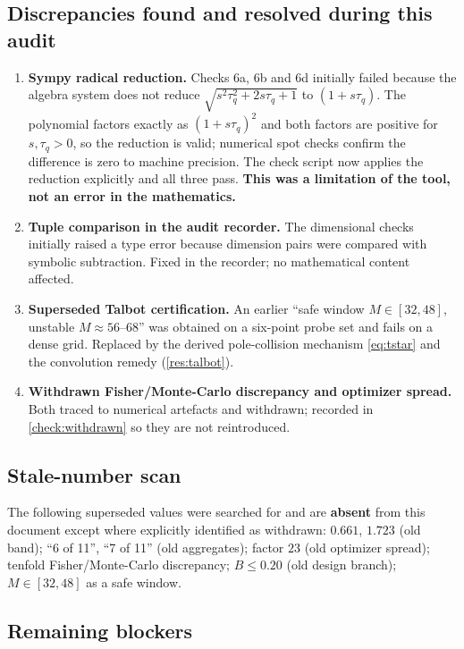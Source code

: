 \documentclass[11pt,a4paper]{article}
\theoremstyle{definition}
\newcommand{\tq}{\tau_{q}}
\newcommand{\Bnum}{B}
\begin{document}
\subsection{Discrepancies found and resolved during this audit}

\begin{enumerate}[label=(D\arabic*)]
\item \textbf{Sympy radical reduction.} Checks 6a, 6b and 6d initially failed
because the algebra system does not reduce
$\sqrt{s^{2}\tq^{2}+2s\tq+1}$ to $(1+s\tq)$. The polynomial factors exactly as
$(1+s\tq)^{2}$ and both factors are positive for $s,\tq>0$, so the reduction is
valid; numerical spot checks confirm the difference is zero to machine
precision. The check script now applies the reduction explicitly and all three
pass. \textbf{This was a limitation of the tool, not an error in the
mathematics.}

\item \textbf{Tuple comparison in the audit recorder.} The dimensional checks
initially raised a type error because dimension pairs were compared with
symbolic subtraction. Fixed in the recorder; no mathematical content affected.

\item \textbf{Superseded Talbot certification.} An earlier ``safe window
$M\in[32,48]$, unstable $M\approx56$--$68$'' was obtained on a six-point probe
set and fails on a dense grid. Replaced by the derived pole-collision mechanism
\eqref{eq:tstar} and the convolution remedy (\cref{res:talbot}).

\item \textbf{Withdrawn Fisher/Monte-Carlo discrepancy and optimizer spread.}
Both traced to numerical artefacts and withdrawn; recorded in
\cref{check:withdrawn} so they are not reintroduced.
\end{enumerate}

\subsection{Stale-number scan}

The following superseded values were searched for and are \textbf{absent} from
this document except where explicitly identified as withdrawn:
$0.661$, $1.723$ (old band); ``6 of 11'', ``7 of 11'' (old aggregates);
factor $23$ (old optimizer spread); tenfold Fisher/Monte-Carlo discrepancy;
$\Bnum\leq0.20$ (old design branch); $M\in[32,48]$ as a safe window.

\subsection{Remaining blockers}
\end{document}
